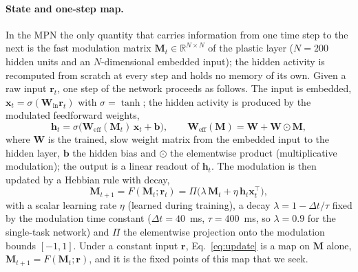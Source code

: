 \documentclass{article}
\begin{document}
\paragraph{State and one-step map.}
In the MPN the only quantity that carries information from one time step to the next is the fast modulation matrix $\mathbf{M}_t \in \mathbb{R}^{N\times N}$ of the plastic layer ($N = 200$ hidden units and an $N$-dimensional embedded input); the hidden activity is recomputed from scratch at every step and holds no memory of its own. Given a raw input $\mathbf{r}_t$, one step of the network proceeds as follows. The input is embedded, $\mathbf{x}_t = \sigma(\mathbf{W}_{\text{in}}\mathbf{r}_t)$ with $\sigma = \tanh$; the hidden activity is produced by the modulated feedforward weights,
\begin{equation}
  \mathbf{h}_t = \sigma\big(\mathbf{W}_{\text{eff}}(\mathbf{M}_t)\,\mathbf{x}_t + \mathbf{b}\big),
  \qquad
  \mathbf{W}_{\text{eff}}(\mathbf{M}) = \mathbf{W} + \mathbf{W}\odot\mathbf{M} ,
\end{equation}
where $\mathbf{W}$ is the trained, slow weight matrix from the embedded input to the hidden layer, $\mathbf{b}$ the hidden bias and $\odot$ the elementwise product (multiplicative modulation); the output is a linear readout of $\mathbf{h}_t$. The modulation is then updated by a Hebbian rule with decay,
\begin{equation}
  \mathbf{M}_{t+1} = F(\mathbf{M}_t;\mathbf{r}_t)
  = \Pi\big(\lambda\,\mathbf{M}_t + \eta\,\mathbf{h}_t\mathbf{x}_t^{\top}\big),
  \label{eq:update}
\end{equation}
with a scalar learning rate $\eta$ (learned during training), a decay $\lambda = 1 - \Delta t/\tau$ fixed by the modulation time constant ($\Delta t = 40$~ms, $\tau = 400$~ms, so $\lambda = 0.9$ for the single-task network) and $\Pi$ the elementwise projection onto the modulation bounds $[-1, 1]$. Under a constant input $\mathbf{r}$, Eq.~\eqref{eq:update} is a map on $\mathbf{M}$ alone, $\mathbf{M}_{t+1} = F(\mathbf{M}_t;\mathbf{r})$, and it is the fixed points of this map that we seek.
\end{document}
